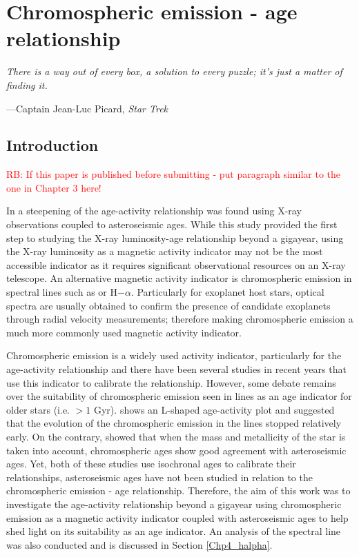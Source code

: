 
\chapter{Chromospheric emission - age relationship} %

\label{Chapter4} %

\epigraph{\itshape There is a way out of every box, a solution to every puzzle; it's just a matter of finding it.}{---Captain Jean-Luc Picard, \itshape Star Trek}

\section{Introduction}
\textcolor{red}{RB: If this paper is published before submitting - put paragraph similar to the one in Chapter 3 here!}

In \citet{Booth_etal_2017} a steepening of the age-activity relationship was found using X-ray observations coupled to asteroseismic ages. While this study provided the first step to studying the X-ray luminosity-age relationship beyond a gigayear, using the X-ray luminosity as a magnetic activity indicator may not be the most accessible indicator as it requires significant observational resources on an X-ray telescope. An alternative magnetic activity indicator is chromospheric emission in spectral lines such as \caII or H$-\alpha$. Particularly for exoplanet host stars, optical spectra are usually obtained to confirm the presence of candidate exoplanets through radial velocity measurements; therefore making chromospheric emission a much more commonly used magnetic activity indicator.

Chromospheric emission is a widely used activity indicator, particularly for the age-activity relationship and there have been several studies in recent years that use this indicator to calibrate the relationship. However, some debate remains over the suitability of chromospheric emission seen in \caII lines as an age indicator for older stars (i.e. $> 1$ Gyr). \citet{Pace_2013} shows an L-shaped age-activity plot and suggested that the evolution of the chromospheric emission in the \caII lines stopped relatively early. On the contrary, \citet{Lorenzo_Oliveira_etal_2016} showed that when the mass and metallicity of the star is taken into account, chromospheric ages show good agreement with asteroseismic ages. Yet, both of these studies use isochronal ages to calibrate their relationships, asteroseismic ages have not been studied in relation to the chromospheric emission - age relationship. Therefore, the aim of this work was to investigate the age-activity relationship beyond a gigayear using chromospheric emission as a magnetic activity indicator coupled with asteroseismic ages to help shed light on its suitability as an age indicator. An analysis of the \Halpha spectral line was also conducted and is discussed in Section \ref{Chp4_halpha}.


